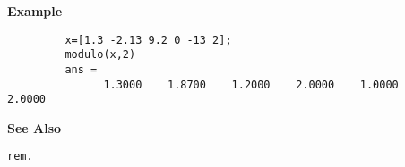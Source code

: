 {\bf \large {}\selectfont Example}
\begin{verbatim}
         x=[1.3 -2.13 9.2 0 -13 2];
         modulo(x,2)	
         ans = 
               1.3000    1.8700    1.2000    2.0000    1.0000    2.0000
\end{verbatim}
\vspace*{.5cm}


{\bf \large {}\selectfont See Also}\\
\hspace*{1.5cm}
\begin{minipage}[t]{13.5cm}
\begin{verbatim}
rem.
\end{verbatim}
\end{minipage}

